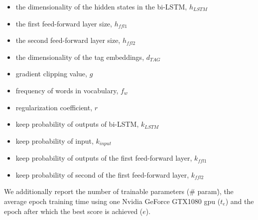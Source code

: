 \documentclass[11pt,letterpaper]{article}
\begin{document}
\begin{itemize}
\item the dimensionality of the hidden states in the bi-LSTM, $h_{LSTM}$ 
\item the first feed-forward layer size, $h_{ffl1}$
\item the second feed-forward layer size, $h_{ffl2}$ 
\item the dimensionality of the tag embeddings, $d_{TAG}$
\item gradient clipping value, $g$
\item frequency of words in vocabulary, $f_w$ 
\item regularization coefficient, $r$ 
\item keep probability of outputs of bi-LSTM, $k_{LSTM}$ 
\item keep probability of input, $k_{input}$
\item keep probability of outputs of the first feed-forward layer, $k_{ffl1}$
\item keep probability of second of the first feed-forward layer, $k_{ffl2}$
\end{itemize}

We additionally report the number of trainable parameters (\# param\.), the average epoch training time using one Nvidia GeForce GTX1080 gpu ($t_e$) and the epoch after which the best score is achieved ($e$).

 	
\end{document}
